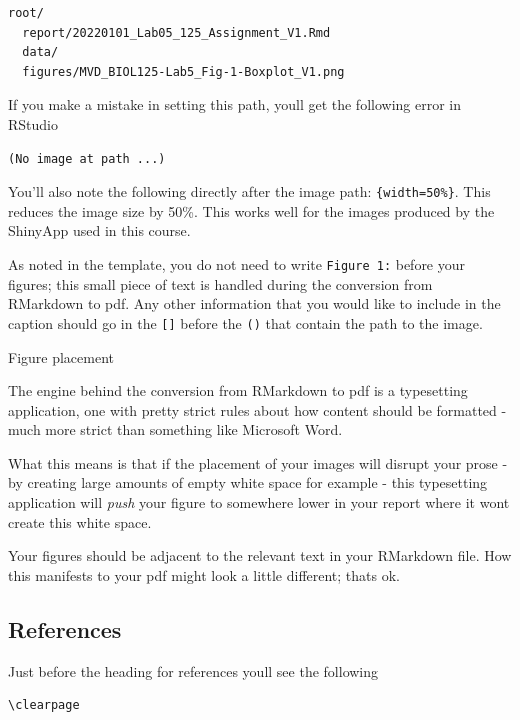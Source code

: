 \documentclass[
]{book}
\begin{document}
\begin{verbatim}
root/
  report/20220101_Lab05_125_Assignment_V1.Rmd
  data/
  figures/MVD_BIOL125-Lab5_Fig-1-Boxplot_V1.png
\end{verbatim}

If you make a mistake in setting this path, you\textquotesingle ll get the following error in RStudio

\begin{verbatim}
(No image at path ...)
\end{verbatim}

You'll also note the following directly after the image path: \texttt{\{width=50\%\}}. This reduces the image size by 50\%. This works well for the images produced by the ShinyApp used in this course.

As noted in the template, you do not need to write \texttt{Figure\ 1:} before your figures; this small piece of text is handled during the conversion from RMarkdown to pdf. Any other information that you would like to include in the caption should go in the \texttt{{[}{]}} before the \texttt{()} that contain the path to the image.

Figure placement

The engine behind the conversion from RMarkdown to pdf is a typesetting application, one with pretty strict rules about how content should be formatted - much more strict than something like Microsoft Word.

What this means is that if the placement of your images will disrupt your prose - by creating large amounts of empty white space for example - this typesetting application will \emph{push} your figure to somewhere lower in your report where it won\textquotesingle t create this white space.

Your figures should be adjacent to the relevant text in your RMarkdown file. How this manifests to your pdf might look a little different; that\textquotesingle s ok.

\hypertarget{references-1}{%
\subsection*{References}\label{references-1}}

Just before the heading for references you\textquotesingle ll see the following

\begin{verbatim}
\clearpage
\end{verbatim}
\end{document}
